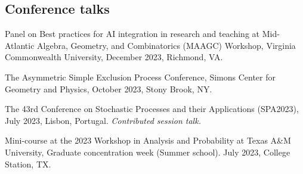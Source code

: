 \documentclass[letterpaper,11pt]{article}
\begin{document}

\subsection*{Conference talks}

\begin{etaremune}
	\item 
	Panel on Best practices for AI integration in research and teaching
	at 
	Mid-Atlantic Algebra, Geometry, and Combinatorics (MAAGC) Workshop, 
	Virginia Commonwealth University,
	December 2023,
	Richmond, VA.

	\item 
	The Asymmetric Simple Exclusion Process Conference, 
	Simons Center for Geometry and Physics,
	October 2023,
	Stony Brook, NY.
	
	\item 
	The 43rd Conference on Stochastic Processes and their
    Applications (SPA2023), July 2023, 
	Lisbon, Portugal.
	\emph{Contributed session talk.}

	\item 
	Mini-course at the
	2023 Workshop in Analysis and Probability at Texas A\&M University, Graduate concentration week (Summer school). July 2023, College Station, TX.


\end{etaremune}
\end{document}
